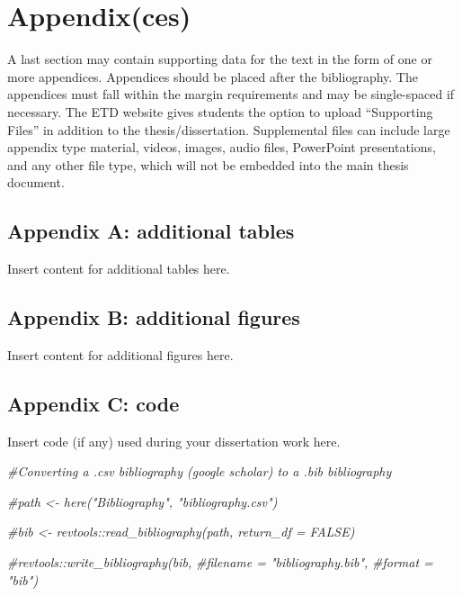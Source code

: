 \documentclass[
  11pt,
]{article}
\newenvironment{Shaded}{\begin{snugshade}}{\end{snugshade}}
\newcommand{\CommentTok}[1]{\textcolor[rgb]{0.56,0.35,0.01}{\textit{#1}}}
\begin{document}
\hypertarget{appendixces}{%
\section{Appendix(ces)}\label{appendixces}}

A last section may contain supporting data for the text in the form of
one or more appendices. Appendices should be placed after the
bibliography. The appendices must fall within the margin requirements
and may be single-spaced if necessary. The ETD website gives students
the option to upload ``Supporting Files'' in addition to the
thesis/dissertation. Supplemental files can include large appendix type
material, videos, images, audio files, PowerPoint presentations, and any
other file type, which will not be embedded into the main thesis
document.

\hypertarget{appendix-a-additional-tables}{%
\subsection{Appendix A: additional
tables}\label{appendix-a-additional-tables}}

Insert content for additional tables here.

\newpage

\hypertarget{appendix-b-additional-figures}{%
\subsection{Appendix B: additional
figures}\label{appendix-b-additional-figures}}

Insert content for additional figures here.

\newpage

\hypertarget{appendix-c-code}{%
\subsection{Appendix C: code}\label{appendix-c-code}}

Insert code (if any) used during your dissertation work here.

\begin{Shaded}
\begin{Highlighting}[]
\CommentTok{\#Converting a .csv bibliography (google scholar) to a .bib bibliography }

\CommentTok{\#path \textless{}{-} here("Bibliography", "bibliography.csv")}

\CommentTok{\#bib \textless{}{-} revtools::read\_bibliography(path, return\_df = FALSE)}

\CommentTok{\#revtools::write\_bibliography(bib,}
\CommentTok{\#filename = "bibliography.bib",}
\CommentTok{\#format = "bib")}
\end{Highlighting}
\end{Shaded}
\end{document}
